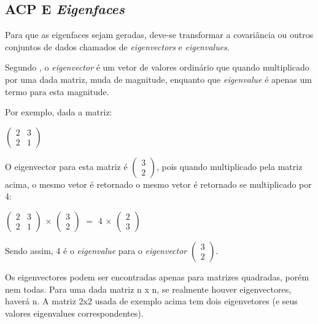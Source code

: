 \subsection{ACP E \textit{Eigenfaces}}\label{subsec:acp-eigen}

Para que as eigenfaces sejam geradas, deve-se transformar a covariância ou outros conjuntos de dados chamados de \textit{eigenvectors} e \textit{eigenvalues}.

Segundo \cite{drmathew_java_programming}, o \textit{eigenvector} é um vetor de valores ordinário que quando multiplicado por uma dada matriz, muda de magnitude, enquanto que \textit{eigenvalue} é apenas um termo para esta magnitude. 

Por exemplo, dada a matriz:

\begin{center}
	$\begin{pmatrix} 2 & 3 \\ 2 & 1 \end{pmatrix}$
\end{center}

O eigenvector para esta matriz é $\begin{pmatrix} 3 \\ 2\end{pmatrix}$, pois quando multiplicado pela matriz acima, o mesmo vetor é retornado o mesmo vetor é retornado se multiplicado por 4:

\begin{center}
	$\begin{pmatrix} 2 & 3 \\ 2 & 1 \end{pmatrix}$ $\times$ $\begin{pmatrix} 3 \\ 2 \end{pmatrix}$ $=$ $4$ $\times$ $\begin{pmatrix} 2 \\ 3\end{pmatrix}$
\end{center}

Sendo assim, 4 é o \textit{eigenvalue} para o \textit{eigenvector}  $\begin{pmatrix} 3 \\ 2\end{pmatrix}$.

Os eigenvectores podem ser encontradas apenas para matrizes quadradas, porém nem todas. Para uma dada matriz n x n, se realmente houver eigenvectores, haverá n. A matriz 2x2 usada de exemplo acima tem dois eigenvetores (e seus valores eigenvalues correspondentes).

